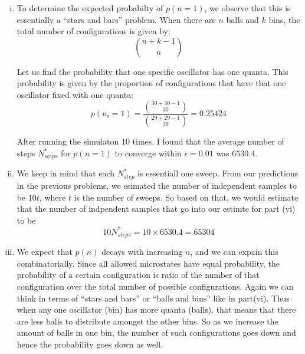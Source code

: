 \documentclass{article}
\begin{document}
\begin{enumerate}[i.]
  \item To determine the expected probabilty of $p(n=1)$, we observe that this is essentially a ``stars and bars'' problem. When there are $n$ balls and $k$ bins, the total number of configurations is given by:
    $$\binom{n+k-1}{n}$$

  Let us find the probability that one specific oscillator has one quanta. This probability is given by the proportion of configurations that have that one oscillator fixed with one quanta:
  $$p(n_i=1) = \frac{\binom{30+30-1}{30}}{\binom{29+29-1}{29}} = 0.25424$$

  After running the simulaton 10 times, I found that the average number of steps $N^*_{steps}$ for $p(n=1)$ to converge within $\epsilon = 0.01$ was $6530.4$.

  \item We keep in mind that each $N^*_{step}$ is essentiall one sweep. From our predictions in the previous problems, we esimated the number of independent samples to be $10t$, where $t$ is the number of sweeps. So based on that, we would estimate that the number of indpendent samples that go into our estimte for part (vi) to be
    $$10N^*_{steps} = 10 \times 6530.4 = 65304$$

  \item We expect that $p(n)$ decays with increasing $n$, and we can expain this combinatorially. Since all allowed microstates have equal probability, the probability of a certain configuration is ratio of the number of that configuration over the total number of possible configurations. Again we can think in terms of ``stars and bars'' or ``balls and bins'' like in part(vi). Thus when any one oscillator (bin) has more quanta (balls), that means that there are less balls to distribute amongst the other bins. So as we increase the amount of balls in one bin, the number of such configurations goes down and hence the probability goes down as well.


\end{enumerate}
\end{document}
